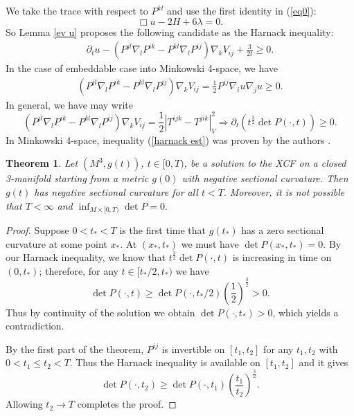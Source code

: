 \documentclass{amsart}
\newtheorem{theorem}{Theorem}
\theoremstyle{definition}
\theoremstyle{remark}
\numberwithin{equation}{section}
\begin{document}
We take the trace with respect to $P^{kl}$ and use the first identity in (\ref{eq0}):
\begin{equation}\label{eq:5}
\Box u-2H+6\lambda=0.
\end{equation}
So Lemma \ref{ev u} proposes the following candidate as the  Harnack inequality:
 \begin{align}\label{harnack est}
\partial_tu-\left(P^{jl}\nabla_lP^{ik}-P^{kl}\nabla_l P^{ij}\right)\nabla_kV_{ij}+\frac{3}{2t}\geq 0.
\end{align}
In the case of embeddable case into Minkowski 4-space, we have
 \begin{align}\label{question}
 \left(P^{jl}\nabla_lP^{ik}-P^{kl}\nabla_l P^{ij}\right)\nabla_kV_{ij}=\frac{1}{2}P^{ij}\nabla_i u\nabla_j u\geq 0.
 \end{align}
 In general, we have may write
 \[\left(P^{jl}\nabla_lP^{ik}-P^{kl}\nabla_l P^{ij}\right)\nabla_kV_{ij}=\frac{1}{2}\left|T^{ijk}-T^{jik}\right|^2_{V}\Rightarrow \partial_t\left(t^{\frac{3}{2}}\det P(\cdot,t)\right)\geq 0. \]
In Minkowski 4-space, inequality (\ref{harnack est}) was proven  by the authors \cite{BIS4}.
\begin{theorem}
Let $(M^3,g(t))$, $t\in [0,T)$, be a solution to the XCF on a closed 3-manifold starting from a metric $g(0)$ with negative sectional curvature. Then $g(t)$ has negative sectional curvature for all $t<T.$
Moreover, it is not possible that $T<\infty$ and $\inf_{M\times [0,T)}\det P=0.$
\end{theorem}
\begin{proof}
Suppose $0<t_{\ast}<T$ is the first time that $g(t_{\ast})$ has a zero sectional curvature at some point $x_{\ast}$. At $(x_{\ast},t_{\ast})$ we must have $\det P(x_{\ast},t_{\ast})=0.$
By our Harnack inequality, we know that $t^{\frac{3}{2}}\det P(\cdot,t) $ is increasing in time on $(0,t_{\ast})$; therefore, for any $t\in [t_{\ast}/2, t_{\ast})$ we have
\[\det P(\cdot,t)\geq \det P(\cdot,t_{\ast}/2)\left(\frac{1}{2}\right)^{\frac{3}{2}}>0.\]
Thus by continuity of the solution we obtain $\det P(\cdot,t_{\ast})>0$, which yields a contradiction.

By the first part of the theorem, $P^{ij}$ is invertible on $[t_1,t_2]$ for any $t_1,t_2$ with $0<t_1\leq t_2<T.$ Thus the Harnack inequality is available on $[t_1,t_2]$ and it gives
\[\det P(\cdot,t_2)\geq \det P(\cdot,t_1)\left(\frac{t_1}{t_2}\right)^{\frac{3}{2}}.\]
Allowing $t_2\to T$ completes the proof.
\end{proof}
\end{document}
